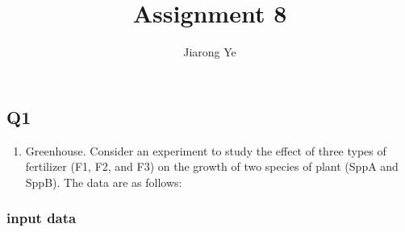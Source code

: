 \documentclass[11pt]{article}
\title{Assignment 8}
\author{Jiarong Ye}
\providecommand{\tightlist}{%
      \setlength{\itemsep}{0pt}\setlength{\parskip}{0pt}}
\begin{document}
    
    
    \maketitle
    
    

    
    \subsection*{Q1}\label{q1}

\begin{enumerate}
\def\labelenumi{\arabic{enumi}.}
\tightlist
\item
  Greenhouse. Consider an experiment to study the effect of three types
  of fertilizer (F1, F2, and F3) on the growth of two species of plant
  (SppA and SppB). The data are as follows:
\end{enumerate}

    \subsubsection*{input data}\label{input-data}
\end{document}
